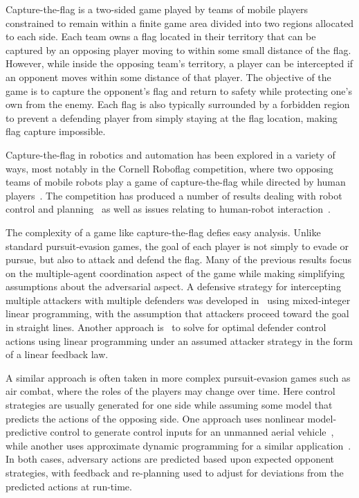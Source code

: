 \documentclass[letterpaper, 10 pt, conference]{ieeeconf}  %
\numberwithin{algorithm}{section}
\begin{document}
Capture-the-flag is a two-sided game played by teams of mobile players constrained to remain within a finite game area divided into two regions allocated to each side. Each team owns a flag located in their territory that can be captured by an opposing player moving to within some small distance of the flag. However, while inside the opposing team's territory, a player can be intercepted if an opponent moves within some distance of that player. The objective of the game is to capture the opponent's flag and return to safety while protecting one's own from the enemy. Each flag is also typically surrounded by a forbidden region to prevent a defending player from simply staying at the flag location, making flag capture impossible. 

Capture-the-flag in robotics and automation has been explored in a variety of ways, most notably in the Cornell Roboflag competition, where two opposing teams of mobile robots play a game of capture-the-flag while directed by human players~\cite{DAndrea:2003p95}. The competition has produced a number of results dealing with robot control and planning~\cite{Earl:2007p101, Campbell:2003p5, Waydo:2003p97} as well as issues relating to human-robot interaction~\cite{Parasuraman:2005p99}. 

The complexity of a game like capture-the-flag defies easy analysis. Unlike standard pursuit-evasion games, the goal of each player is not simply to evade or pursue, but also to attack and defend the flag. Many of the previous results focus on the multiple-agent coordination aspect of the game while making simplifying assumptions about the adversarial aspect. A defensive strategy for intercepting multiple attackers with multiple defenders was developed in~\cite{Earl:2007p101} using mixed-integer linear programming, with the assumption that attackers proceed toward the goal in straight lines. Another approach is~\cite{Chasparis:2005p102} to solve for optimal defender control actions using linear programming under an assumed attacker strategy in the form of a linear feedback law. 

A similar approach is often taken in more complex pursuit-evasion games such as air combat, where the roles of the players may change over time. Here control strategies are usually generated for one side while assuming some model that predicts the actions of the opposing side. One approach uses nonlinear model-predictive control to generate control inputs for an unmanned aerial vehicle~\cite{Sprinkle:2004p100}, while another uses approximate dynamic programming for a similar application~\cite{McGrew:2008p103}. In both cases, adversary actions are predicted based upon expected opponent strategies, with feedback and re-planning used to adjust for deviations from the predicted actions at run-time. 
\end{document}
